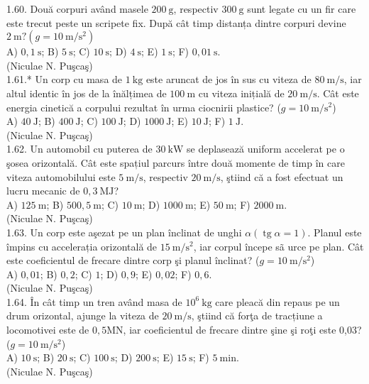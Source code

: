 1.60. Două corpuri având masele $200 \mathrm{~g}$, respectiv $300 \mathrm{~g}$ sunt legate cu un fir care este trecut peste un scripete fix. După cât timp distanța dintre corpuri devine $2 \mathrm{~m}? (g=10 \mathrm{~m} / \mathrm{s}^{2})$\\ A) $0,1 \mathrm{~s}$; B) $5 \mathrm{~s}$; C) $10 \mathrm{~s}$; D) $4 \mathrm{~s}$; E) $1 \mathrm{~s}$; F) $0,01 \mathrm{~s}$.\\ (Niculae N. Puşcaş)\\

1.61.* Un corp cu masa de $1 \mathrm{~kg}$ este aruncat de jos în sus cu viteza de $80 \mathrm{~m} / \mathrm{s}$, iar altul identic în jos de la înălțimea de $100 \mathrm{~m}$ cu viteza inițială de $20 \mathrm{~m} / \mathrm{s}$. Cât este energia cinetică a corpului rezultat în urma ciocnirii plastice? ($g=10 \mathrm{~m} / \mathrm{s}^{2}$)\\ A) $40 \mathrm{~J}$; B) $400 \mathrm{~J}$; C) $100 \mathrm{~J}$; D) $1000 \mathrm{~J}$; E) $10 \mathrm{~J}$; F) $1 \mathrm{~J}$.\\ (Niculae N. Puşcaş)\\

1.62. Un automobil cu puterea de $30 \mathrm{~kW}$ se deplasează uniform accelerat pe o şosea orizontală. Cât este spațiul parcurs între două momente de timp în care viteza automobilului este $5 \mathrm{~m} / \mathrm{s}$, respectiv $20 \mathrm{~m} / \mathrm{s}$, ştiind că a fost efectuat un lucru mecanic de $0,3 \mathrm{~MJ}$?\\ A) $125 \mathrm{~m}$; B) $500,5 \mathrm{~m}$; C) $10 \mathrm{~m}$; D) $1000 \mathrm{~m}$; E) $50 \mathrm{~m}$; F) $2000 \mathrm{~m}$.\\ (Niculae N. Puşcaş)\\

1.63. Un corp este aşezat pe un plan înclinat de unghi $\alpha (\operatorname{tg} \alpha=1)$. Planul este împins cu accelerația orizontală de $15 \mathrm{~m} / \mathrm{s}^{2}$, iar corpul începe sã urce pe plan. Cât este coeficientul de frecare dintre corp şi planul înclinat? ($g=10 \mathrm{~m} / \mathrm{s}^{2}$)\\ A) $0,01$; B) $0,2$; C) $1$; D) $0,9$; E) $0,02$; F) $0,6$.\\ (Niculae N. Puşcaş)\\

1.64. În cât timp un tren având masa de $10^{6} \mathrm{~kg}$ care pleacă din repaus pe un drum orizontal, ajunge la viteza de $20 \mathrm{~m} / \mathrm{s}$, ştiind că forţa de tracțiune a locomotivei este de $0,5 \mathrm{MN}$, iar coeficientul de frecare dintre şine şi roţi este 0,03? ($g=10 \mathrm{~m} / \mathrm{s}^{2}$)\\ A) $10 \mathrm{~s}$; B) $20 \mathrm{~s}$; C) $100 \mathrm{~s}$; D) $200 \mathrm{~s}$; E) $15 \mathrm{~s}$; F) $5 \mathrm{~min}$.\\ (Niculae N. Puşcaş)\\

